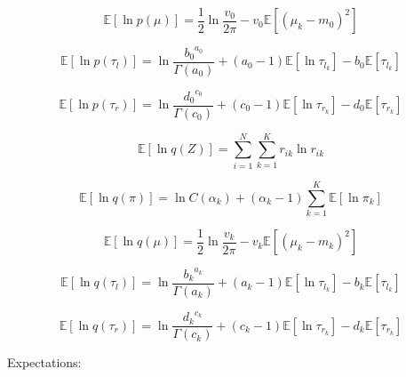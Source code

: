 \documentclass[runningheads]{llncs}
\begin{document}
\begin{equation}
   \mathbb{E}[\ln p(\mu)] = \frac{1}{2}\ln \frac{v_0}{2\pi} - v_0\mathbb{E}[(\mu_k-m_0)^2]
\end{equation}

\begin{equation}
   \mathbb{E}[\ln p(\tau_l)] = \ln \frac{{b_0}^{a_0}}{\Gamma(a_0)} + (a_0-1)\mathbb{E}[\ln \tau_{l_k}]-b_0\mathbb{E}[\tau_{l_k}]
\end{equation}

\begin{equation}
   \mathbb{E}[\ln p(\tau_r)] = \ln \frac{{d_0}^{c_0}}{\Gamma(c_0)} + (c_0-1)\mathbb{E}[\ln \tau_{r_k}]-d_0\mathbb{E}[\tau_{r_k}]
\end{equation}

\begin{equation}
   \mathbb{E}[\ln q(Z)] = \sum_{i=1}^{N}\sum_{k=1}^{K}r_{ik}\ln r_{ik}
\end{equation}

\begin{equation}
   \mathbb{E}[\ln q(\pi)] = \ln C(\alpha_k)+(\alpha_k-1)\sum_{k=1}^{K}\mathbb{E}[\ln \pi_k]
\end{equation}

\begin{equation}
   \mathbb{E}[\ln q(\mu)]= \frac{1}{2}\ln \frac{v_k}{2\pi} - v_k\mathbb{E}[(\mu_k-m_k)^2]
\end{equation}

\begin{equation}
   \mathbb{E}[\ln q(\tau_l)] = \ln \frac{{b_k}^{a_k}}{\Gamma(a_k)} + (a_k-1)\mathbb{E}[\ln \tau_{l_k}]-b_k\mathbb{E}[\tau_{l_k}]
\end{equation}

\begin{equation}
   \mathbb{E}[\ln q(\tau_r)] = \ln \frac{{d_k}^{c_k}}{\Gamma(c_k)} + (c_k-1)\mathbb{E}[\ln \tau_{r_k}]-d_k\mathbb{E}[\tau_{r_k}]
\end{equation}

Expectations: 
\end{document}
